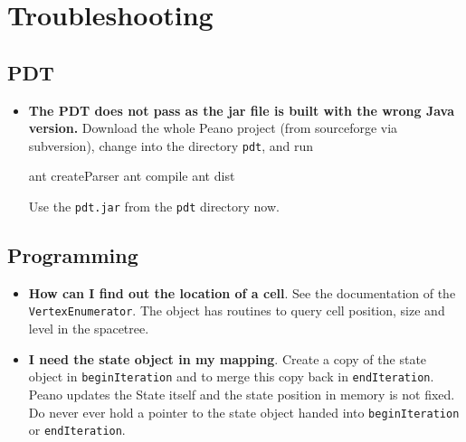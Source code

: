 \chapter{Troubleshooting}

\section{PDT}

\begin{itemize}
  \item {\bf The PDT does not pass as the jar file is built with the wrong Java
  version.} Download the whole Peano project (from sourceforge via subversion),
  change into the directory \texttt{pdt}, and run
  \begin{code}
  ant createParser
  ant compile
  ant dist
  \end{code}
  Use the \texttt{pdt.jar} from the \texttt{pdt} directory now. 
\end{itemize}



\section{Programming}

\begin{itemize}
  \item {\bf How can I find out the location of a cell}. See the documentation
  of the \texttt{VertexEnumerator}. The object has routines to query cell
  position, size and level in the spacetree.
  \item {\bf I need the state object in my mapping}. Create a copy of the state
  object in \texttt{beginIteration} and to merge this copy back in \texttt{endIteration}. 
  Peano updates the State itself and the state position in memory is not fixed.
  Do never ever hold a pointer to the state object handed into
  \texttt{beginIteration} or \texttt{endIteration}.
\end{itemize}
